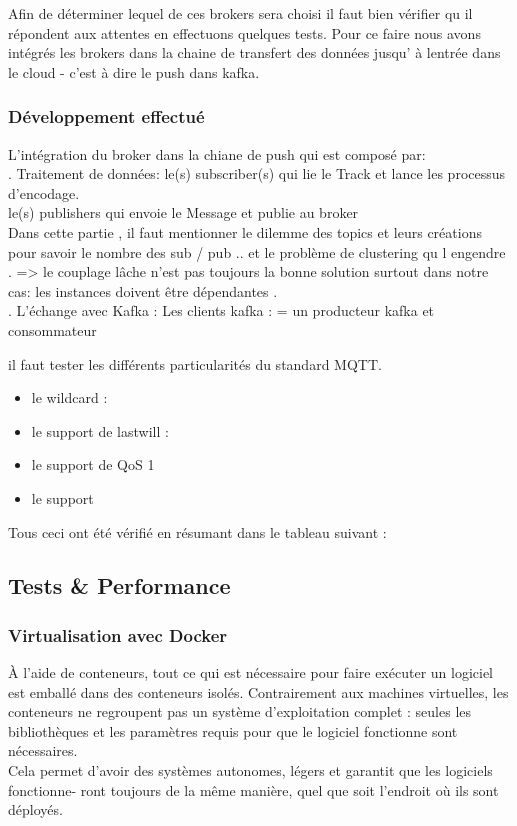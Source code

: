         Afin de déterminer lequel de ces brokers sera choisi il faut bien vérifier qu il répondent aux attentes en effectuons quelques tests. 
        Pour ce faire nous avons intégrés les brokers dans la chaine de transfert des données jusqu' à lentrée dans le cloud - 
        c'est à dire le push dans kafka.


        \subsubsection{Développement effectué}

        L'intégration du broker dans la chiane de push qui est composé par:\\
         . Traitement de données:
            le(s) subscriber(s) qui lie le Track et lance les processus d’encodage. \\
            le(s) publishers qui envoie le Message et publie au broker \\
        Dans cette partie , il faut mentionner le dilemme des topics et leurs créations 
        pour savoir le nombre des sub / pub .. et le problème de clustering qu l engendre . 
        => le couplage lâche n’est pas toujours la bonne solution surtout dans notre cas: les instances doivent être dépendantes . \\

        . L’échange avec Kafka : 
            Les clients kafka : = un producteur kafka  et consommateur


        il faut tester les différents particularités du standard MQTT. 
        \begin{itemize}
                \item le wildcard : 
                \item le support de lastwill : 
                \item le support de QoS 1 
                \item le support 
            \end{itemize} 
           
            Tous ceci ont été vérifié en résumant dans le tableau suivant : 

    \subsection{Tests \& Performance}
    \subsubsection{Virtualisation avec Docker}
    À l’aide de conteneurs, tout ce qui est nécessaire pour faire exécuter un logiciel est emballé
    dans des conteneurs isolés. Contrairement aux machines virtuelles, les conteneurs ne regroupent
    pas un système d’exploitation complet : seules les bibliothèques et les paramètres requis pour
    que le logiciel fonctionne sont nécessaires.\\
    Cela permet d’avoir des systèmes autonomes, légers et garantit que les logiciels fonctionne-
    ront toujours de la même manière, quel que soit l’endroit où ils sont déployés.

